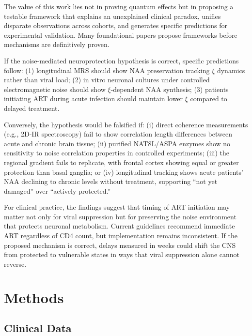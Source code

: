 \documentclass[10pt,a4paper]{article}
\begin{document}
The value of this work lies not in proving quantum effects but in proposing a testable framework that explains an unexplained clinical paradox, unifies disparate observations across cohorts, and generates specific predictions for experimental validation. Many foundational papers propose frameworks before mechanisms are definitively proven.

If the noise-mediated neuroprotection hypothesis is correct, specific predictions follow: (1) longitudinal MRS should show NAA preservation tracking $\xi$ dynamics rather than viral load; (2) in vitro neuronal cultures under controlled electromagnetic noise should show $\xi$-dependent NAA synthesis; (3) patients initiating ART during acute infection should maintain lower $\xi$ compared to delayed treatment.

Conversely, the hypothesis would be falsified if: (i) direct coherence measurements (e.g., 2D-IR spectroscopy) fail to show correlation length differences between acute and chronic brain tissue; (ii) purified NAT8L/ASPA enzymes show no sensitivity to noise correlation properties in controlled experiments; (iii) the regional gradient fails to replicate, with frontal cortex showing equal or greater protection than basal ganglia; or (iv) longitudinal tracking shows acute patients' NAA declining to chronic levels without treatment, supporting ``not yet damaged'' over ``actively protected.''

For clinical practice, the findings suggest that timing of ART initiation may matter not only for viral suppression but for preserving the noise environment that protects neuronal metabolism. Current guidelines recommend immediate ART regardless of CD4 count\cite{palella1998}, but implementation remains inconsistent. If the proposed mechanism is correct, delays measured in weeks could shift the CNS from protected to vulnerable states in ways that viral suppression alone cannot reverse.

\section{Methods}

\subsection{Clinical Data}
\end{document}
